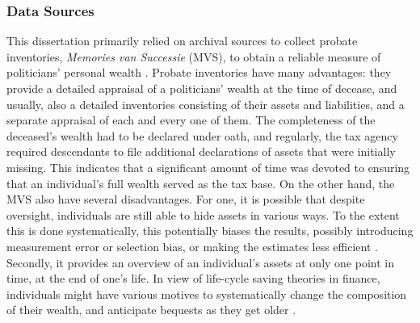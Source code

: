 \subsubsection{Data Sources}
This dissertation primarily relied on archival sources to collect probate inventories, \textit{Memories van Successie} (MVS), to obtain a reliable measure of politicians' personal wealth \citep{bos1990vermogensbezitters}. Probate inventories have many advantages: they provide a detailed appraisal of a politicians' wealth at the time of decease, and usually, also a detailed inventories consisting of their assets and liabilities, and a separate appraisal of each and every one of them. The completeness of the deceased's wealth had to be declared under oath, and regularly, the tax agency required descendants to file additional declarations of assets that were initially missing. This indicates that a significant amount of time was devoted to ensuring that an individual's full wealth served as the tax base. On the other hand, the MVS also have several disadvantages. For one, it is possible that despite oversight, individuals are still able to hide assets in various ways. To the extent this is done systematically, this potentially biases the results, possibly introducing measurement error or selection bias, or making the estimates less efficient \citep{angrist2008mostly}. Secondly, it provides an overview of an individual's assets at only one point in time, at the end of one's life. In view of life-cycle saving theories in finance, individuals might have various motives to systematically change the composition of their wealth, and anticipate bequests as they get older \citep{dynan2002importance}. 


